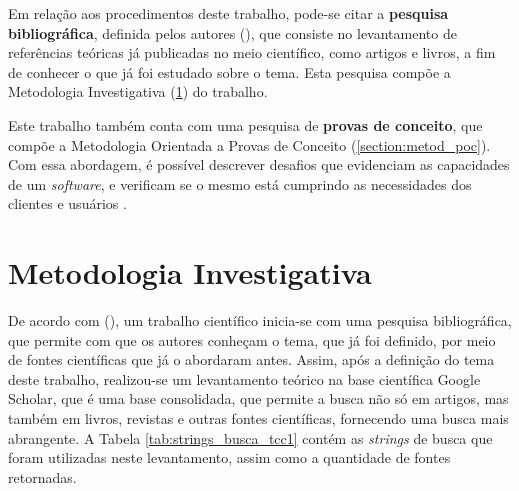 Em relação aos procedimentos deste trabalho, pode-se citar a \textbf{pesquisa bibliográfica}, 
definida pelos autores  (\citeyear{gerhardt2009metodos}), 
que consiste no levantamento de referências teóricas já publicadas no meio científico, como artigos e livros, 
a fim de conhecer o que já foi estudado sobre o tema. Esta pesquisa compõe a Metodologia Investigativa (\ref{section:metod_investigativa}) do trabalho.

Este trabalho também conta com uma pesquisa de \textbf{provas de conceito}, que compõe a Metodologia Orientada a Provas de Conceito (\ref{section:metod_poc}). 
Com essa abordagem, é possível descrever desafios que evidenciam as 
capacidades de um \textit{software}, e verificam se o mesmo está cumprindo as necessidades dos clientes e usuários \cite{prasanna2021poc}.


\section{Metodologia Investigativa}
\label{section:metod_investigativa}

De acordo com  (\citeyear{gil2002elaborar}), 
um trabalho científico inicia-se com uma pesquisa bibliográfica, 
que permite com que os autores conheçam o tema, que já foi definido, por meio de fontes 
científicas que já o abordaram antes. Assim, após a definição do tema deste trabalho, realizou-se 
um levantamento teórico na base científica Google Scholar, que é uma base consolidada, que permite 
a busca não só em artigos, mas também em livros, revistas e outras fontes científicas, fornecendo 
uma busca mais abrangente. A Tabela \ref{tab:strings_busca_tcc1} contém as \textit{strings} de busca que foram utilizadas 
neste levantamento, assim como a quantidade de fontes retornadas.


